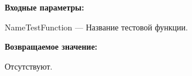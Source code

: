 \textbf{Входные параметры:}

NameTestFunction --- Название тестовой функции.

\textbf{Возвращаемое значение:}

Отсутствуют.